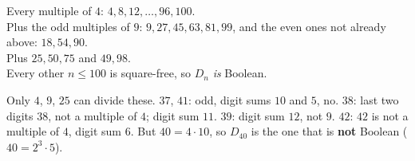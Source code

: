 \documentclass{fkt-notes}
\theoremstyle{definition}
\begin{document}
\begin{rulebox}[title={Not square-free, $n\le100$ (so $D_n$ is not Boolean)}]
  Every multiple of $4$: $4,8,12,\dots,96,100$.\\
  Plus the odd multiples of $9$: $9,27,45,63,81,99$,
  and the even ones not already above: $18,54,90$.\\
  Plus $25,50,75$ and $49,98$.\\
  Every other $n\le100$ is square-free, so $D_n$ \emph{is} Boolean.
\end{rulebox}

\begin{example}[$D_{37},D_{38},D_{39},D_{40},D_{41},D_{42}$]
  Only $4$, $9$, $25$ can divide these. $37$, $41$: odd, digit sums $10$
  and $5$, no. $38$: last two digits $38$, not a multiple of $4$; digit sum
  $11$. $39$: digit sum $12$, not $9$. $42$: $42$ is not a multiple of
  $4$, digit sum $6$. But $40=4\cdot10$, so $D_{40}$ is the one that is
  \textbf{not} Boolean ($40=2^3\cdot5$).
\end{example}
\end{document}
